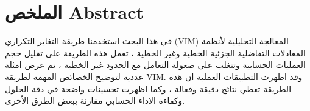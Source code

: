 \chapter*{الملخص Abstract}
في هذا البحث استخدمنا طريقة التغاير التكراري (VIM) المعالجة التحليلية لأنظمة المعادلات التفاضلية الجزئية الخطية وغير الخطية ، تعمل هذه الطريقة على تقليل حجم العمليات الحسابية وتتغلب على صعولة التعامل مع الحدود غير الخطية ، تم عرض امثلة عددية لتوضيح الخصائص المهمة لطريقة VIM. وقد اظهرت التطبيقات العملية ان هذه الطريقة تعطي نتائج دقيقة وفعالة ، وكما اظهرت تحسينات واضحة في دقة الحلول وكفاءة الاداء الحسابي مقارنة ببعض الطرق الأخرى.